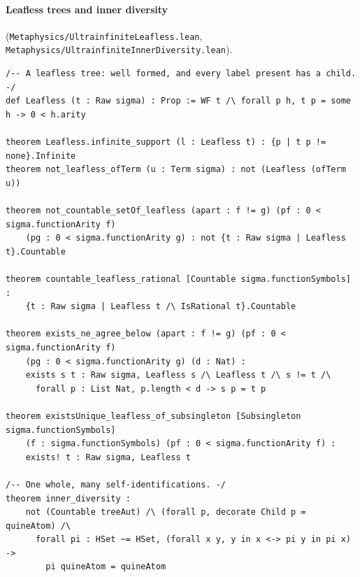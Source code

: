\documentclass[]{article}
\theoremstyle{definition}
\theoremstyle{remark}
\newcommand{\lpath}[1]{{\ttfamily\nolinkurl{#1}}}
\newcommand{\meta}[1]{\lpath{Metaphysics/#1.lean}}
\begin{document}
\paragraph{Leafless trees and inner diversity} (\meta{UltrainfiniteLeafless},
\meta{UltrainfiniteInnerDiversity}).
\begin{lstlisting}
/-- A leafless tree: well formed, and every label present has a child. -/
def Leafless (t : Raw sigma) : Prop := WF t /\ forall p h, t p = some h -> 0 < h.arity

theorem Leafless.infinite_support (l : Leafless t) : {p | t p != none}.Infinite
theorem not_leafless_ofTerm (u : Term sigma) : not (Leafless (ofTerm u))

theorem not_countable_setOf_leafless (apart : f != g) (pf : 0 < sigma.functionArity f)
    (pg : 0 < sigma.functionArity g) : not {t : Raw sigma | Leafless t}.Countable

theorem countable_leafless_rational [Countable sigma.functionSymbols] :
    {t : Raw sigma | Leafless t /\ IsRational t}.Countable

theorem exists_ne_agree_below (apart : f != g) (pf : 0 < sigma.functionArity f)
    (pg : 0 < sigma.functionArity g) (d : Nat) :
    exists s t : Raw sigma, Leafless s /\ Leafless t /\ s != t /\
      forall p : List Nat, p.length < d -> s p = t p

theorem existsUnique_leafless_of_subsingleton [Subsingleton sigma.functionSymbols]
    (f : sigma.functionSymbols) (pf : 0 < sigma.functionArity f) :
    exists! t : Raw sigma, Leafless t

/-- One whole, many self-identifications. -/
theorem inner_diversity :
    not (Countable treeAut) /\ (forall p, decorate Child p = quineAtom) /\
      forall pi : HSet ~= HSet, (forall x y, y in x <-> pi y in pi x) ->
        pi quineAtom = quineAtom
\end{lstlisting}
\end{document}
